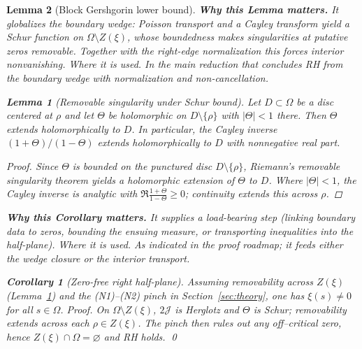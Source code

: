 \documentclass[11pt]{article}
\newtheorem{lemma}{Lemma}[section]
\newtheorem{corollary}{Corollary}[section]
\theoremstyle{definition}
\theoremstyle{remark}
\begin{document}
\begin{lemma}[Block Gershgorin lower bound]
\vspace{1.0cm}
\noindent\textbf{Why this Lemma matters.} It globalizes the boundary wedge: Poisson transport and a Cayley transform yield a Schur function on $\Omega\setminus Z(\xi)$, whose boundedness makes singularities at putative zeros removable. Together with the right-edge normalization this forces interior nonvanishing.
\noindent\textit{Where it is used.} In the main reduction that concludes RH from the boundary wedge with normalization and non-cancellation.
\begin{lemma}[Removable singularity under Schur bound]
\label{lem:removable-schur}
Let $D\subset\Omega$ be a disc centered at $\rho$ and let $\Theta$ be holomorphic on $D\setminus\{\rho\}$ with $|\Theta|<1$ there. Then $\Theta$ extends holomorphically to $D$. In particular, the Cayley inverse $(1+\Theta)/(1-\Theta)$ extends holomorphically to $D$ with nonnegative real part.
\end{lemma}
\begin{proof}
Since $\Theta$ is bounded on the punctured disc $D\setminus\{\rho\}$, Riemann's removable singularity theorem yields a holomorphic extension of $\Theta$ to $D$. Where $|\Theta|<1$, the Cayley inverse is analytic with $\Re\tfrac{1+\Theta}{1-\Theta}\ge 0$; continuity extends this across $\rho$.
\end{proof}








\vspace{1.0cm}
\noindent\textbf{Why this Corollary matters.} It supplies a load-bearing step (linking boundary data to zeros, bounding the ensuing measure, or transporting inequalities into the half-plane).
\noindent\textit{Where it is used.} As indicated in the proof roadmap; it feeds either the wedge closure or the interior transport.
\begin{corollary}[Zero-free right half-plane]
  Assuming removability across $Z(\xi)$ (Lemma~\ref{lem:removable-schur}) and the (N1)–(N2)
  pinch in Section~\ref{sec:theory},   %
  one has $\xi(s)\neq 0$ for all $s\in\Omega$.
\emph{Proof.}
On $\Omega\setminus Z(\xi)$, $2\mathcal J$ is Herglotz and $\Theta$ is Schur; removability extends across each $\rho\in Z(\xi)$. The pinch then rules out any off–critical zero, hence $Z(\xi)\cap\Omega=\varnothing$ and RH holds. \qed
\end{corollary}





\end{lemma}
\end{document}
